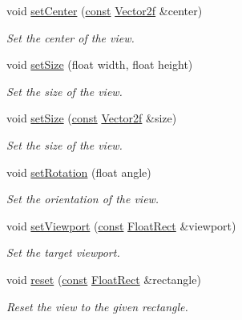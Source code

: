 \begin{DoxyCompactItemize}
void \hyperlink{classsf_1_1_view_ab0296b03793e0873e6ae9e15311f3e78}{set\-Center} (\hyperlink{term__entry_8h_a57bd63ce7f9a353488880e3de6692d5a}{const} \hyperlink{namespacesf_a80cea3c46537294fd1d8d428566ad8b2}{Vector2f} \&center)
\begin{DoxyCompactList}\small\item\em Set the center of the view. \end{DoxyCompactList}\item 
void \hyperlink{classsf_1_1_view_a9525b73fe9fbaceb9568faf56b399dab}{set\-Size} (float width, float height)
\begin{DoxyCompactList}\small\item\em Set the size of the view. \end{DoxyCompactList}\item 
void \hyperlink{classsf_1_1_view_a9e08d471ce21aa0e69ce55ff9de66d29}{set\-Size} (\hyperlink{term__entry_8h_a57bd63ce7f9a353488880e3de6692d5a}{const} \hyperlink{namespacesf_a80cea3c46537294fd1d8d428566ad8b2}{Vector2f} \&size)
\begin{DoxyCompactList}\small\item\em Set the size of the view. \end{DoxyCompactList}\item 
void \hyperlink{classsf_1_1_view_a24d0503c9c51f5ef5918612786d325c1}{set\-Rotation} (float angle)
\begin{DoxyCompactList}\small\item\em Set the orientation of the view. \end{DoxyCompactList}\item 
void \hyperlink{classsf_1_1_view_a8eaec46b7d332fe834f016d0187d4b4a}{set\-Viewport} (\hyperlink{term__entry_8h_a57bd63ce7f9a353488880e3de6692d5a}{const} \hyperlink{namespacesf_ab0d978f5903922a6bdfca1736b71ccc9}{Float\-Rect} \&viewport)
\begin{DoxyCompactList}\small\item\em Set the target viewport. \end{DoxyCompactList}\item 
void \hyperlink{classsf_1_1_view_ac95b636eafab3922b7e8304fb6c00d7d}{reset} (\hyperlink{term__entry_8h_a57bd63ce7f9a353488880e3de6692d5a}{const} \hyperlink{namespacesf_ab0d978f5903922a6bdfca1736b71ccc9}{Float\-Rect} \&rectangle)
\begin{DoxyCompactList}\small\item\em Reset the view to the given rectangle. \end{DoxyCompactList}\item 

\end{DoxyCompactItemize}
